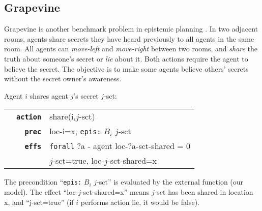 

\subsection{Grapevine}
Grapevine is another benchmark problem in epistemic planning \cite{DBLP:journals/ai/MuiseBFMMPS22}. In two adjacent rooms, agents share secrets they have heard previously to all agents in the same room.
All agents can \emph{move-left} and \emph{move-right} between two rooms, and \emph{share} the truth about someone's secret or \emph{lie} about it.
Both actions require the agent to believe the secret.
The objective is to make some agents believe others' secrets without the secret owner's awareness.

\begin{example}
\label{example:grapvine_action}
Agent $i$ shares agent $j$'s secret $j$-sct:

\begin{tabular}{rl}
~~\texttt{\textbf{action}} & share(i,$j$-sct)\\
~~~~\texttt{\textbf{prec}} & loc-i=x, \texttt{epis:} $B_i$ $j$-sct\\
~~~~\texttt{\textbf{effs}} & \texttt{forall} ?a - agent loc-?a-sct-shared = 0 \\
 & $j$-sct=true, loc-$j$-sct-shared=x\\
\end{tabular}

The precondition ``\texttt{epis:} $B_i$ $j$-sct'' is evaluated by the external function (our model).
The effect ``loc-$j$-sct-shared=x'' means $j$-sct has been shared in location x, and ``j-sct=true'' (if $i$ performs action lie, it would be false).

\end{example}

